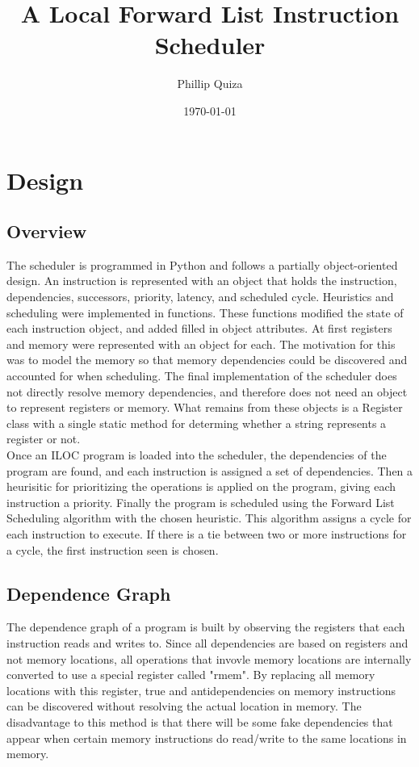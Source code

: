 \documentclass{article}
\title{A Local Forward List Instruction Scheduler}
\date{\today}
\author{Phillip Quiza}
\begin{document}
\maketitle

\section{Design}
\subsection{Overview}
The scheduler is programmed in Python and follows a partially object-oriented design. An instruction is represented with an object that holds the instruction, dependencies, successors, priority, latency, and scheduled cycle. Heuristics and scheduling were implemented in functions. These functions modified the state of each instruction object, and added filled in object attributes. At first registers and memory were represented with an object for each. The motivation for this was to model the memory so that memory dependencies could be discovered and accounted for when scheduling. The final implementation of the scheduler does not directly resolve memory dependencies, and therefore does not need an object to represent registers or memory. What remains from these objects is a Register class with a single static method for determing whether a string represents a register or not.\\

Once an ILOC program is loaded into the scheduler, the dependencies of the program are found, and each instruction is assigned a set of dependencies. Then a heurisitic for prioritizing the operations is applied on the program, giving each instruction a priority. Finally the program is scheduled using the Forward List Scheduling algorithm with the chosen heuristic. This algorithm assigns a cycle for each instruction to execute. If there is a tie between two or more instructions for a cycle, the first instruction seen is chosen. 

\subsection{Dependence Graph}
The dependence graph of a program is built by observing the registers that each instruction reads and writes to. Since all dependencies are based on registers and not memory locations, all operations that invovle memory locations are internally converted to use a special register called "rmem". By replacing all memory locations with this register, true and antidependencies on memory instructions can be discovered without resolving the actual location in memory. The disadvantage to this method is that there will be some fake dependencies that appear when certain memory instructions do read/write to the same locations in memory.
\end{document}
